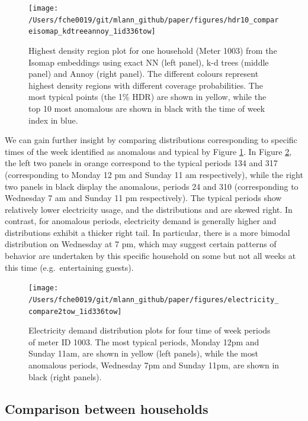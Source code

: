 \documentclass[11pt,a4paper,]{article}
\begin{document}
\begin{figure}

{\centering \texttt{[image: /Users/fche0019/git/mlann\_github/paper/figures/hdr10\_compareisomap\_kdtreeannoy\_1id336tow]} 

}

\caption{Highest density region plot for one household (Meter 1003) from the Isomap embeddings using exact NN (left panel), k-d trees (middle panel) and Annoy (right panel). The different colours represent highest density regions with different coverage probabilities. The most typical points (the 1\% HDR) are shown in yellow, while the top 10 most anomalous are shown in black with the time of week index in blue.}\label{fig:anomalies1id}
\end{figure}

We can gain further insight by comparing distributions corresponding to specific times of the week identified as anomalous and typical by Figure \ref{fig:anomalies1id}. In Figure \ref{fig:compare2tow}, the left two panels in orange correspond to the typical periods 134 and 317 (corresponding to Monday 12 pm and Sunday 11 am respectively), while the right two panels in black display the anomalous, periods 24 and 310 (corresponding to Wednesday 7 am and Sunday 11 pm respectively). The typical periods show relatively lower electricity usage, and the distributions and are skewed right. In contrast, for anomalous periods, electricity demand is generally higher and distributions exhibit a thicker right tail. In particular, there is a more bimodal distribution on Wednesday at 7 pm, which may suggest certain patterns of behavior are undertaken by this specific household on some but not all weeks at this time (e.g.~entertaining guests).

\begin{figure}

{\centering \texttt{[image: /Users/fche0019/git/mlann\_github/paper/figures/electricity\_compare2tow\_1id336tow]} 

}

\caption{Electricity demand distribution plots for four time of week periods of meter ID 1003. The most typical periods, Monday 12pm and Sunday 11am, are shown in yellow (left panels), while the most anomalous periods, Wednesday 7pm and Sunday 11pm, are shown in black (right panels). }\label{fig:compare2tow}
\end{figure}

\hypertarget{comparison-between-households}{%
\subsection{Comparison between households}\label{comparison-between-households}}
\end{document}
